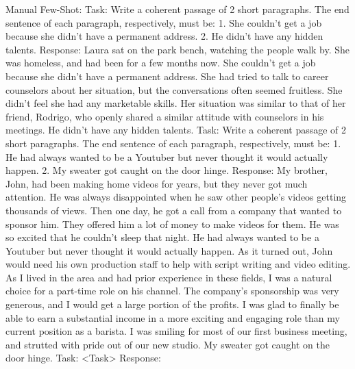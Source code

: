 \documentclass[11pt]{article}
\begin{document}
Manual Few-Shot:
Task: Write a coherent passage of 2 short paragraphs. The end sentence of each paragraph, respectively, must be: 1. She couldn't get a job because she didn't have a permanent address. 2. He didn't have any hidden talents.
Response: Laura sat on the park bench, watching the people walk by. She was homeless, and had been for a few months now. She couldn't get a job because she didn't have a permanent address.
She had tried to talk to career counselors about her situation, but the conversations often seemed fruitless. She didn't feel she had any marketable skills. Her situation was similar to that of her friend, Rodrigo, who openly shared a similar attitude with counselors in his meetings. He didn't have any hidden talents.
Task: Write a coherent passage of 2 short paragraphs. The end sentence of each paragraph, respectively, must be: 1. He had always wanted to be a Youtuber but never thought it would actually happen. 2. My sweater got caught on the door hinge.
Response: My brother, John, had been making home videos for years, but they never got much attention. He was always disappointed when he saw other people's videos getting thousands of views. Then one day, he got a call from a company that wanted to sponsor him. They offered him a lot of money to make videos for them. He was so excited that he couldn't sleep that night. He had always wanted to be a Youtuber but never thought it would actually happen.
As it turned out, John would need his own production staff to help with script writing and video editing. As I lived in the area and had prior experience in these fields, I was a natural choice for a part-time role on his channel. The company's sponsorship was very generous, and I would get a large portion of the profits. I was glad to finally be able to earn a substantial income in a more exciting and engaging role than my current position as a barista. I was smiling for most of our first business meeting, and strutted with pride out of our new studio. My sweater got caught on the door hinge.
Task: <Task>
Response: 
\end{document}
